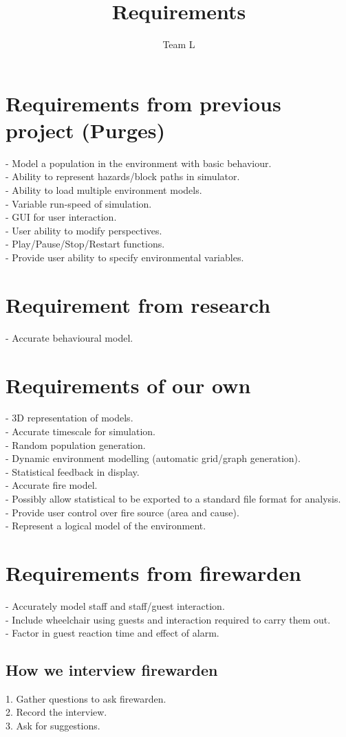 \documentclass[a4paper,10pt]{article}
\title{Requirements}
\author{Team L}
\begin{document}
\maketitle

\section{Requirements from previous project (Purges)}
  - Model a population in the environment with basic behaviour.\\
  - Ability to represent hazards/block paths in simulator.\\
  - Ability to load multiple environment models.\\
  - Variable run-speed of simulation.\\
  - GUI for user interaction.\\
  - User ability to modify perspectives.\\
  - Play/Pause/Stop/Restart functions.\\
  - Provide user ability to specify environmental variables.\\
  
\section{Requirement from research}
  - Accurate behavioural model.
  
\section{Requirements of our own}
 - 3D representation of models.\\
 - Accurate timescale for simulation.\\
 - Random population generation.\\
 - Dynamic environment modelling (automatic grid/graph generation).\\
 - Statistical feedback in display.\\
 - Accurate fire model.\\
 - Possibly allow statistical to be exported to a standard file format for analysis.\\
 - Provide user control over fire source (area and cause).\\
 - Represent a logical model of the environment.\\
 
 \section{Requirements from firewarden}
 - Accurately model staff and staff/guest interaction.\\
 - Include wheelchair using guests and interaction required to carry them out.\\
 - Factor in guest reaction time and effect of alarm.\\
 \subsection{How we interview firewarden}
  1. Gather questions to ask firewarden.\\
  2. Record the interview.\\
  3. Ask for suggestions.\\
  
\end{document}
